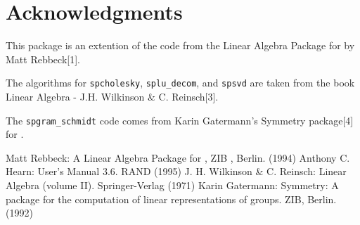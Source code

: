 \section{Acknowledgments}
This package is an extention of the code from the Linear Algebra Package
for \REDUCE{} by Matt Rebbeck[1].

The algorithms for {\tt spcholesky}, {\tt splu\_decom}, and {\tt spsvd} are 
taken from the book Linear Algebra - J.H. Wilkinson \& C. Reinsch[3].

The {\tt spgram\_schmidt} code comes from Karin Gatermann's Symmetry 
package[4] for {\REDUCE}.


\begin{thebibliography}{}
 Matt Rebbeck: A Linear Algebra Package for {\REDUCE}, ZIB
, Berlin. (1994)
 Anthony C. Hearn: {\REDUCE} User's Manual 3.6.
	RAND (1995)
 J. H. Wilkinson \& C. Reinsch: Linear Algebra 
(volume II). Springer-Verlag (1971)
 Karin Gatermann: Symmetry: A {\REDUCE} package for the 
computation of linear representations of groups. ZIB, Berlin. (1992)
\end{thebibliography}


